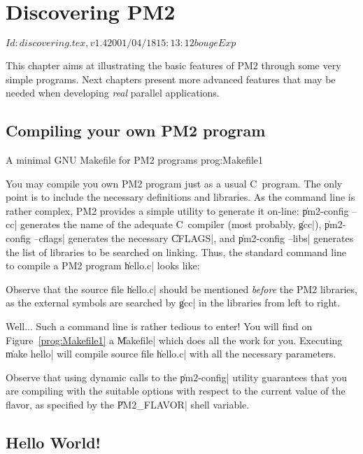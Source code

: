 \chapter{Discovering PM2}

\stamp $Id: discovering.tex,v 1.4 2001/04/18 15:13:12 bouge Exp $

This chapter aims at illustrating the basic features of PM2 through
some very simple programs. Next chapters present more advanced
features that may be needed when developing \emph{real} parallel
applications.

\section{Compiling your own PM2 program}

 {A minimal GNU Makefile for PM2
  programs} {prog:Makefile1}

You may compile you own PM2 program just as a usual C~program. The
only point is to include the necessary definitions and libraries.  As
the command line is rather complex, PM2 provides a simple utility to
generate it on-line: \|pm2-config --cc| generates the name of the
adequate C~compiler (most probably, \|gcc|), \|pm2-config --cflags|
generates the necessary \|CFLAGS|, and \|pm2-config --libs| generates
the list of libraries to be searched on linking. Thus, the standard
command line to compile a PM2 program \|hello.c| looks like:
Observe that the source file \|hello.c| should be mentioned
\emph{before} the PM2 libraries, as the external symbols are searched by
\|gcc| in the libraries from left to right.

Well... Such a command line is rather tedious to enter! You will find
on Figure~\ref{prog:Makefile1} a \|Makefile| which does all the work
for you. Executing \|make hello| will compile source file \|hello.c|
with all the necessary parameters.

Observe that using dynamic calls to the \|pm2-config| utility guarantees
that you are compiling with the suitable options with respect to the
current value of the flavor, as specified by the \|PM2_FLAVOR|
shell variable.

\section{Hello World!}

